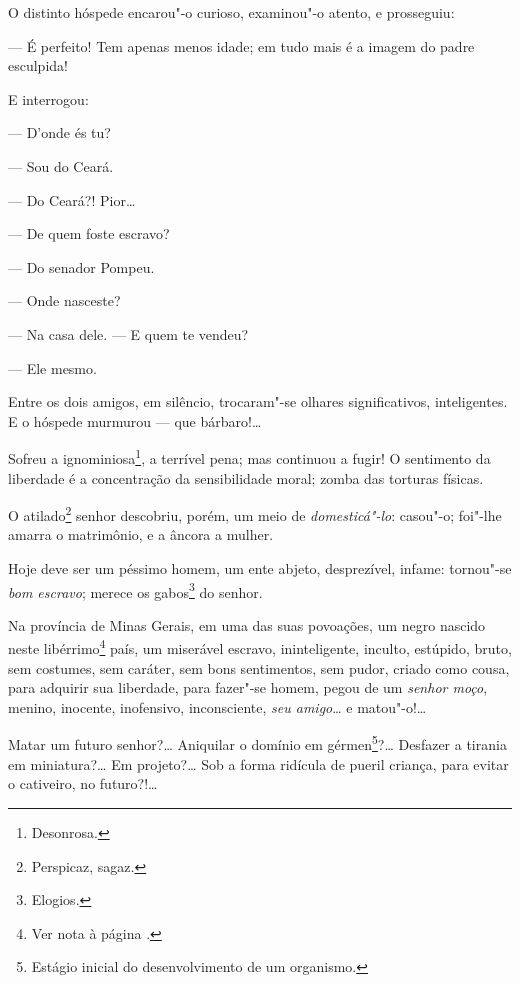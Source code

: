   O distinto hóspede encarou"-o curioso, examinou"-o atento, e prosseguiu:

--- É perfeito! Tem apenas menos idade; em tudo mais é a imagem do
padre esculpida!

E interrogou:

  --- D'onde és tu?

  --- Sou do Ceará.

  --- Do Ceará?! Pior\ldots{}

  --- De quem foste escravo?

  --- Do senador Pompeu.

  --- Onde nasceste?

  --- Na casa dele.
  --- E quem te vendeu?

  --- Ele mesmo.

  Entre os dois amigos, em silêncio, trocaram"-se olhares significativos,
  inteligentes. E o hóspede murmurou --- que bárbaro!\ldots{}


  Sofreu a ignominiosa\footnote{Desonrosa.}, a terrível pena; mas
  continuou a fugir! O sentimento da liberdade é a concentração da
  sensibilidade moral; zomba das torturas físicas.

  O atilado\footnote{Perspicaz, sagaz.} senhor descobriu, porém, um
    meio de \emph{domesticá"-lo}: casou"-o; foi"-lhe amarra o matrimônio, e a
    âncora a mulher.

  Hoje deve ser um péssimo homem, um ente abjeto, desprezível, infame:
  tornou"-se \emph{bom escravo}; merece os gabos\footnote{Elogios.} do
  senhor.

\asterisc

  Na província de Minas Gerais, em uma das suas povoações, um negro
  nascido neste libérrimo\footnote{Ver nota à página \pageref{liberrimo}.} país, um miserável escravo,
  ininteligente, inculto, estúpido, bruto, sem costumes, sem caráter,
  sem bons sentimentos, sem pudor, criado como cousa, para adquirir sua
  liberdade, para fazer"-se homem, pegou de um \emph{senhor moço},
  menino, inocente, inofensivo, inconsciente, \emph{seu amigo}\ldots{} e
  matou"-o!\ldots{}

  Matar um futuro senhor?\ldots{} Aniquilar o domínio em gérmen\footnote{
    Estágio inicial do desenvolvimento de um organismo.}?\ldots{} Desfazer a
  tirania em miniatura?\ldots{} Em projeto?\ldots{} Sob a forma ridícula de pueril
  criança, para evitar o cativeiro, no futuro?!\ldots{}

